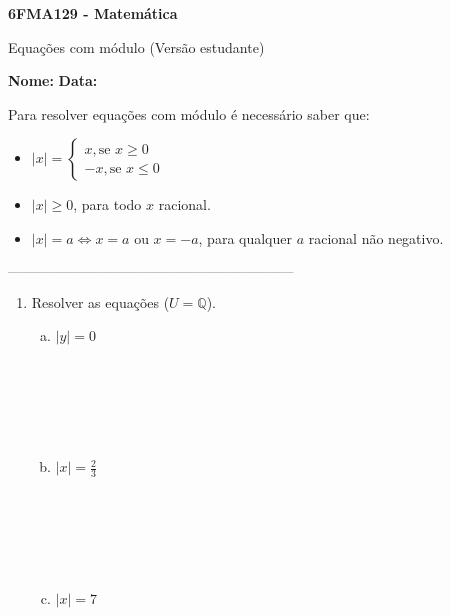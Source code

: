 \documentclass[a4paper,14pt]{article}
\begin{document}
	
	\noindent\textbf{6FMA129 - Matemática} 
	
	\begin{center}Equações com módulo (Versão estudante)
	\end{center}
	
	\noindent\textbf{Nome:} \underline{\hspace{10cm}}
	\noindent\textbf{Data:} \underline{\hspace{4cm}}
	
	
	\begin{multicols}{2}
	    \noindent Para resolver equações com módulo é necessário saber que: \\
	    \begin{itemize}
	    	\item $|x| = \begin{cases}
	    		x, \text{se~} x \geq 0 \\
	    		-x, \text{se~} x \leq 0
	    	\end{cases}$
	    	\item $|x| \geq 0$, para todo $x$ racional.
	    	\item $|x| = a \Leftrightarrow x = a$ ou $x = -a$, para qualquer $a$ racional não negativo.
	    \end{itemize}
		\noindent\textsubscript{--------------------------------------------------------------------------}
		\begin{enumerate} 
			\item Resolver as equações ($U = \mathbb{Q}$).
			\begin{enumerate}[a)]
				\item $|y| = 0$ \\\\\\\\\\\\
				\item $|x| = \frac{2}{3}$ \\\\\\\\\\\\
				\item $|x| = 7$ \\\\\\\\\\\\

\end{enumerate}
\end{enumerate}
\end{multicols}
\end{document}
